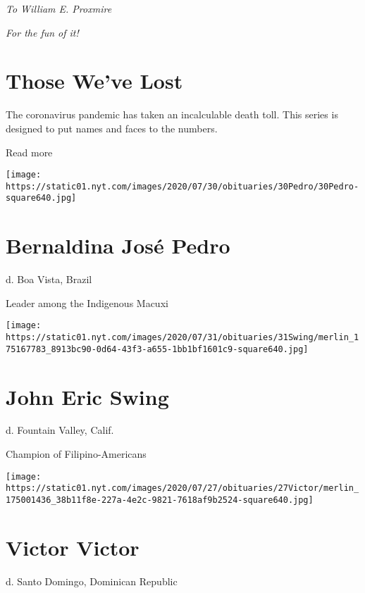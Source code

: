 \emph{To William E. Proxmire}

\emph{For the fun of it!}

\href{https://www.nytimes.com/interactive/2020/obituaries/people-died-coronavirus-obituaries.html?action=click\&pgtype=Article\&state=default\&region=BELOW_MAIN_CONTENT\&context=covid_obits_promo}{}

\hypertarget{those-weve-lost}{%
\section{Those We've Lost}\label{those-weve-lost}}

The coronavirus pandemic has taken an incalculable death toll. This
series is designed to put names and faces to the numbers.

Read more

\texttt{[image: https://static01.nyt.com/images/2020/07/30/obituaries/30Pedro/30Pedro-square640.jpg]}

\hypertarget{bernaldina-josuxe9-pedro}{%
\section{Bernaldina José Pedro}\label{bernaldina-josuxe9-pedro}}

d. Boa Vista, Brazil

Leader among the Indigenous Macuxi

\texttt{[image: https://static01.nyt.com/images/2020/07/31/obituaries/31Swing/merlin\_175167783\_8913bc90-0d64-43f3-a655-1bb1bf1601c9-square640.jpg]}

\hypertarget{john-eric-swing}{%
\section{John Eric Swing}\label{john-eric-swing}}

d. Fountain Valley, Calif.

Champion of Filipino-Americans

\texttt{[image: https://static01.nyt.com/images/2020/07/27/obituaries/27Victor/merlin\_175001436\_38b11f8e-227a-4e2c-9821-7618af9b2524-square640.jpg]}

\hypertarget{victor-victor}{%
\section{Victor Victor}\label{victor-victor}}

d. Santo Domingo, Dominican Republic

